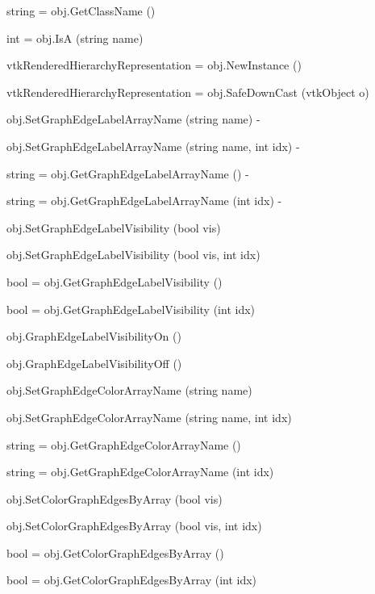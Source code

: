 \begin{DoxyItemize}
\item {\ttfamily string = obj.\-Get\-Class\-Name ()}  
\item {\ttfamily int = obj.\-Is\-A (string name)}  
\item {\ttfamily vtk\-Rendered\-Hierarchy\-Representation = obj.\-New\-Instance ()}  
\item {\ttfamily vtk\-Rendered\-Hierarchy\-Representation = obj.\-Safe\-Down\-Cast (vtk\-Object o)}  
\item {\ttfamily obj.\-Set\-Graph\-Edge\-Label\-Array\-Name (string name)} -\/  
\item {\ttfamily obj.\-Set\-Graph\-Edge\-Label\-Array\-Name (string name, int idx)} -\/  
\item {\ttfamily string = obj.\-Get\-Graph\-Edge\-Label\-Array\-Name ()} -\/  
\item {\ttfamily string = obj.\-Get\-Graph\-Edge\-Label\-Array\-Name (int idx)} -\/  
\item {\ttfamily obj.\-Set\-Graph\-Edge\-Label\-Visibility (bool vis)}  
\item {\ttfamily obj.\-Set\-Graph\-Edge\-Label\-Visibility (bool vis, int idx)}  
\item {\ttfamily bool = obj.\-Get\-Graph\-Edge\-Label\-Visibility ()}  
\item {\ttfamily bool = obj.\-Get\-Graph\-Edge\-Label\-Visibility (int idx)}  
\item {\ttfamily obj.\-Graph\-Edge\-Label\-Visibility\-On ()}  
\item {\ttfamily obj.\-Graph\-Edge\-Label\-Visibility\-Off ()}  
\item {\ttfamily obj.\-Set\-Graph\-Edge\-Color\-Array\-Name (string name)}  
\item {\ttfamily obj.\-Set\-Graph\-Edge\-Color\-Array\-Name (string name, int idx)}  
\item {\ttfamily string = obj.\-Get\-Graph\-Edge\-Color\-Array\-Name ()}  
\item {\ttfamily string = obj.\-Get\-Graph\-Edge\-Color\-Array\-Name (int idx)}  
\item {\ttfamily obj.\-Set\-Color\-Graph\-Edges\-By\-Array (bool vis)}  
\item {\ttfamily obj.\-Set\-Color\-Graph\-Edges\-By\-Array (bool vis, int idx)}  
\item {\ttfamily bool = obj.\-Get\-Color\-Graph\-Edges\-By\-Array ()}  
\item {\ttfamily bool = obj.\-Get\-Color\-Graph\-Edges\-By\-Array (int idx)}  

\end{DoxyItemize}
